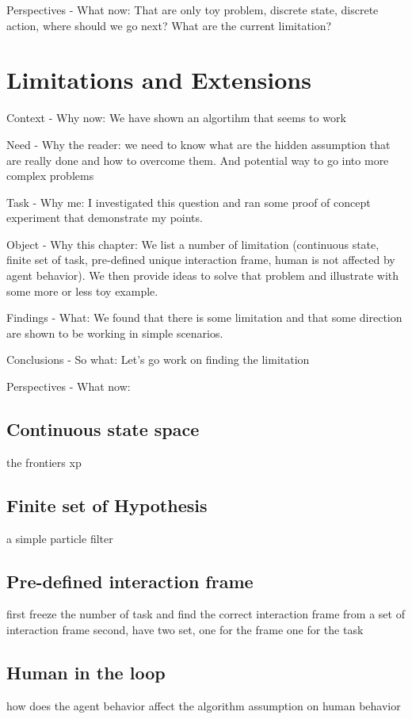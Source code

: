 Perspectives - What now: That are only toy problem, discrete state, discrete action, where should we go next? What are the current limitation?

\chapter{Limitations and Extensions}
\minitoc

Context - Why now: We have shown an algortihm that seems to work

Need - Why the reader: we need to know what are the hidden assumption that are really done and how to overcome them. And potential way to go into more complex problems

Task - Why me: I investigated this question and ran some proof of concept experiment that demonstrate my points.

Object - Why this chapter: We list a number of limitation (continuous state, finite set of task, pre-defined unique interaction frame, human is not affected by agent behavior). We then provide ideas to solve that problem and illustrate with some more or less toy example.

Findings - What: We found that there is some limitation and that some direction are shown to be working in simple scenarios.

Conclusions - So what: Let's go work on finding the limitation

Perspectives - What now: 

\section{Continuous state space}
the frontiers xp

\section{Finite set of Hypothesis}
a simple particle filter

\section{Pre-defined interaction frame}
first freeze the number of task and find the correct interaction frame from a set of interaction frame
second, have two set, one for the frame one for the task

\section{Human in the loop}
how does the agent behavior affect the algorithm assumption on human behavior

